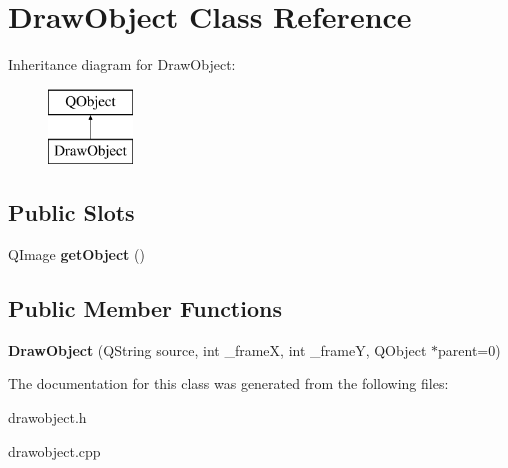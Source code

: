 \hypertarget{class_draw_object}{}\section{Draw\+Object Class Reference}
\label{class_draw_object}
Inheritance diagram for Draw\+Object\+:\begin{figure}[H]
\begin{center}
\leavevmode
\includegraphics[height=2.000000cm]{class_draw_object}
\end{center}
\end{figure}
\subsection*{Public Slots}
\begin{DoxyCompactItemize}
\item 
\hypertarget{class_draw_object_aa32cf1d16d28633a145dcf28c899a9f2}{}Q\+Image {\bfseries get\+Object} ()\label{class_draw_object_aa32cf1d16d28633a145dcf28c899a9f2}

\end{DoxyCompactItemize}
\subsection*{Public Member Functions}
\begin{DoxyCompactItemize}
\item 
\hypertarget{class_draw_object_ad2957b36afe08d84a3a4b5de876cac30}{}{\bfseries Draw\+Object} (Q\+String source, int \+\_\+frame\+X, int \+\_\+frame\+Y, Q\+Object $\ast$parent=0)\label{class_draw_object_ad2957b36afe08d84a3a4b5de876cac30}

\end{DoxyCompactItemize}


The documentation for this class was generated from the following files\+:\begin{DoxyCompactItemize}
\item 
drawobject.\+h\item 
drawobject.\+cpp\end{DoxyCompactItemize}
